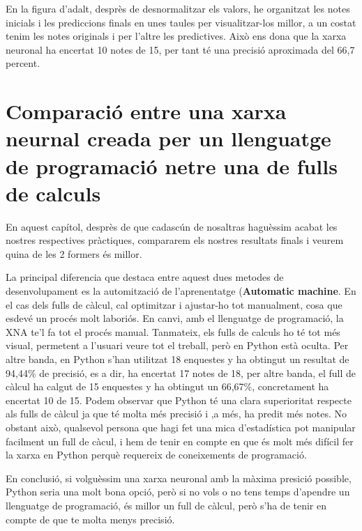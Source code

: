 En la figura d'adalt, desprès de desnormalitzar els valors, he organitzat les notes inicials i les prediccions finals en unes taules per visualitzar-los millor, a un costat tenim les notes originals i per l'altre les predictives.
 Això ens dona que la xarxa neuronal ha encertat 10 notes de 15, per tant té una precisió aproximada del 66,7 percent.

\section{Comparació entre una xarxa neurnal creada per un llenguatge de programació netre una de fulls de calculs}
En aquest capítol, desprès de que cadascún de nosaltras haguèssim acabat les nostres respectives pràctiques, compararem els nostres resultats finals i veurem quina de les 2 formers és millor.

La principal diferencia que destaca entre aquest dues metodes de desenvolupament es la automització de l'aprenentatge (\textbf{Automatic machine}. En el cas dels fulls de càlcul, cal optimitzar i ajustar-ho tot manualment, cosa que esdevé un procés molt laboriós. En canvi, amb el llenguatge de programació, la XNA te'l fa tot el procés manual. Tanmateix, els fulls de calculs ho té tot més visual, permetent a l'usuari veure tot el treball, però en Python està oculta.
Per altre banda, en Python s'han utilitzat 18 enquestes y ha obtingut un resultat de 94,44\% de precisió, es a dir, ha encertat 17 notes de 18, per altre banda, el full de càlcul ha calgut de 15 enquestes y ha obtingut un 66,67\%, concretament ha encertat 10 de 15.
Podem observar que Python té una clara superioritat respecte als fulls de càlcul ja que té molta més precisió i ,a més, ha predit més notes. No obstant això, qualsevol persona que hagi fet una mica d'estadística pot manipular facilment un full de càcul, i hem de tenir en compte en que és molt més difícil fer la xarxa en Python perquè requereix de coneixements de programació.

En conclusió, si volguèssim una xarxa neuronal amb la màxima presició possible, Python seria una molt bona opció, però si no vols o no tens temps d'apendre un llenguatge de programació, és millor un full de càlcul, però s'ha de tenir en compte de que te molta menys precisió.






















